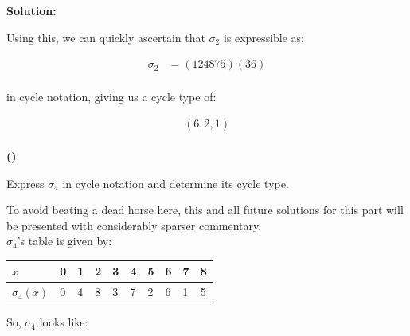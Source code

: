 \documentclass{article}
\newenvironment{solution}{
	\vspace{.5em}
	\par
	\begin{adjustwidth}{1.5em}{}
	\textbf{{Solution:}}
	\par
	\vspace{.5em}
}{
	\vspace{1em}
	\end{adjustwidth}
	\setcounter{step}{0}
}
\newcounter{step}
\renewcommand{\thestep}{\Roman{step}}
\newenvironment{step}{
	\refstepcounter{step}
	\vspace{1em}\par\noindent
	\ignorespaces\noindent\textbf{(\thestep)}
	\ignorespaces
}{
	\par
	\vspace{1.5em}
}
\begin{document}
\begin{solution}
	Using this, we can quickly ascertain that $\sigma_{2}$ is expressible as:

	\begin{align*}
		\sigma_{2} &= (124875)(36) \\
	\end{align*}

	in cycle notation, giving us a cycle type of:

	\begin{gather*}
		(6, 2, 1) \\
	\end{gather*}

	\begin{step}
		Express $\sigma_{4}$ in cycle notation and determine its cycle type.
	\end{step}

	To avoid beating a dead horse here, this and all future solutions for this part will be presented with considerably sparser commentary. \\

	$\sigma_{4}$'s table is given by:

	\vspace{2em}

	\begin{tabularx}{\linewidth}{Y | *{9}{Y}}
		$x$ & 0 & 1 & 2 & 3 & 4 & 5 & 6 & 7 & 8 \\
		\hline
		$\sigma_{4}(x)$ & 0 & 4 & 8 & 3 & 7 & 2 & 6 & 1 & 5 \\
	\end{tabularx}

	\vspace{2em}

	So, $\sigma_{4}$ looks like:

	\vspace{2em}

	\begin{center}
	\end{center}


\end{solution}
\end{document}

